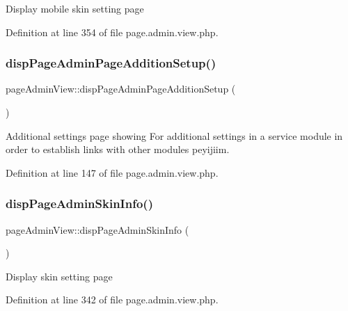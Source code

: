Display mobile skin setting page 

Definition at line 354 of file page.\+admin.\+view.\+php.

\mbox{\label{classpageAdminView_aad653a82f425e9af960d9ee3998d8662}} 
\subsubsection{\texorpdfstring{disp\+Page\+Admin\+Page\+Addition\+Setup()}{dispPageAdminPageAdditionSetup()}}
{\footnotesize\ttfamily page\+Admin\+View\+::disp\+Page\+Admin\+Page\+Addition\+Setup (\begin{DoxyParamCaption}{ }\end{DoxyParamCaption})}



Additional settings page showing For additional settings in a service module in order to establish links with other modules peyijiim. 



Definition at line 147 of file page.\+admin.\+view.\+php.

\mbox{\label{classpageAdminView_a1363d4ec28d54542578fd7d91455a7bd}} 
\subsubsection{\texorpdfstring{disp\+Page\+Admin\+Skin\+Info()}{dispPageAdminSkinInfo()}}
{\footnotesize\ttfamily page\+Admin\+View\+::disp\+Page\+Admin\+Skin\+Info (\begin{DoxyParamCaption}{ }\end{DoxyParamCaption})}

Display skin setting page 

Definition at line 342 of file page.\+admin.\+view.\+php.

\mbox{\label{classpageAdminView_a1b0aaafae4f1de46ba2388457f8ef2cb}} 
